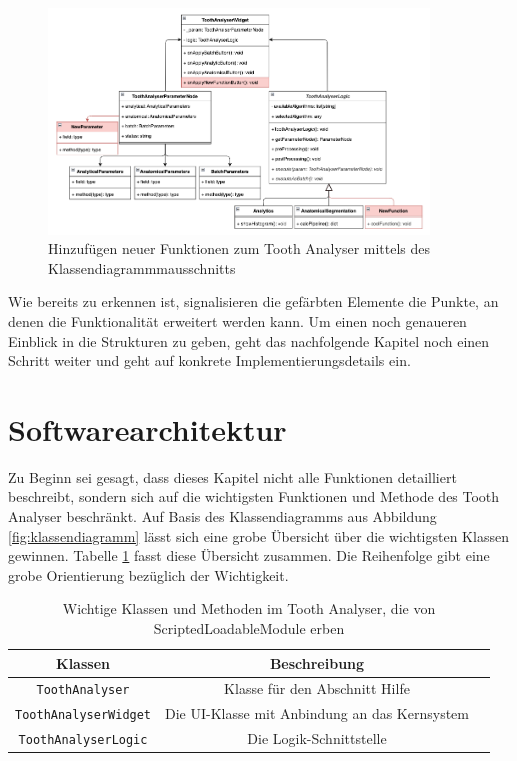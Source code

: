 \begin{figure}[h]
	\centering
	\includegraphics[width=0.9\textwidth]{
		img/tooth_analyser_class_diagram_new.png
	}
	\caption{Hinzufügen neuer Funktionen zum Tooth Analyser mittels des
	Klassendiagrammmausschnitts}
	\label{fig:klassendiagramm_new}
\end{figure}

Wie bereits zu erkennen ist, signalisieren die gefärbten Elemente die Punkte, an
denen die Funktionalität erweitert werden kann. Um einen noch genaueren Einblick
in die Strukturen zu geben, geht das nachfolgende Kapitel noch einen Schritt weiter
und geht auf konkrete Implementierungsdetails ein.

\pagebreak

\section{Softwarearchitektur}
\label{sec:technische_umsetzung} Zu Beginn sei gesagt, dass dieses Kapitel nicht
alle Funktionen detailliert beschreibt, sondern sich auf die wichtigsten
Funktionen und Methode des Tooth Analyser beschränkt. Auf Basis des Klassendiagramms
aus Abbildung \ref{fig:klassendiagramm} lässt sich eine grobe Übersicht über die
wichtigsten Klassen gewinnen. Tabelle \ref{tab:methoden_klassen} fasst diese
Übersicht zusammen. Die Reihenfolge gibt eine grobe Orientierung bezüglich der Wichtigkeit.

\begin{table}[h]
	\centering
	\begin{tabular}{|c|c|c|}
		\hline
		\textbf{Klassen}             & \textbf{Beschreibung}                              \\
		\hline
		\texttt{ToothAnalyser}       & Klasse für den Abschnitt Hilfe                     \\
		\hline
		\texttt{ToothAnalyserWidget} & Die \ac{UI}-Klasse mit Anbindung an das Kernsystem \\
		\hline
		\texttt{ToothAnalyserLogic}  & Die Logik-Schnittstelle                            \\
		\hline
	\end{tabular}
	\caption{Wichtige Klassen und Methoden im Tooth Analyser, die von ScriptedLoadableModule
	erben}
	\label{tab:methoden_klassen}
\end{table}

